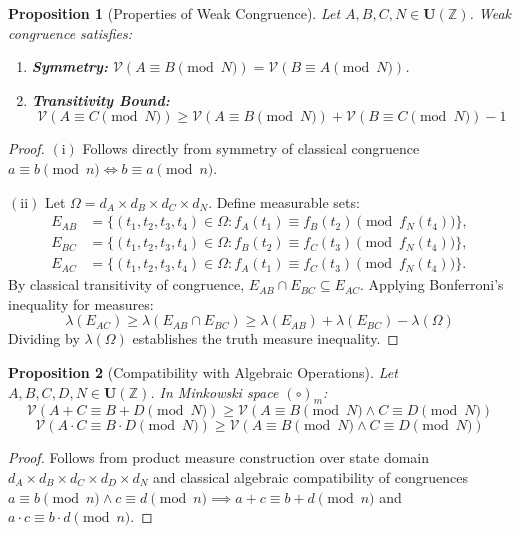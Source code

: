 \documentclass[a4paper,14pt, twoside]{memoir}
\newtheorem{proposition}{Proposition}[chapter]
\newcommand{\tsbd}[1]{\mathbf{U}(\mathbb{#1})}
\newcommand{\ddclmd}{\mathcal{V}} %
\begin{document}
	\begin{proposition}[Properties of Weak Congruence]
		Let $A, B, C, N \in \tsbd{Z}$. Weak congruence satisfies:
		\begin{enumerate}[label=$\mathrm{(\roman*)}$]
			\item \textbf{Symmetry:} $\ddclmd(A \equiv B \pmod N) = \ddclmd(B \equiv A \pmod N)$.
			\item \textbf{Transitivity Bound:} 
			\[
			\ddclmd(A \equiv C \pmod N) \ge \ddclmd(A \equiv B \pmod N) + \ddclmd(B \equiv C \pmod N) - 1
			\]
		\end{enumerate}
	\end{proposition}
	
	\begin{proof}
		$\mathrm{(i)}$ Follows directly from symmetry of classical congruence $a \equiv b \pmod n \iff b \equiv a \pmod n$.
		
		$\mathrm{(ii)}$ Let $\Omega = d_A \times d_B \times d_C \times d_N$. Define measurable sets:
		\begin{align*}
			E_{AB} &= \{(t_1, t_2, t_3, t_4) \in \Omega : f_A(t_1) \equiv f_B(t_2) \pmod{f_N(t_4)}\}, \\
			E_{BC} &= \{(t_1, t_2, t_3, t_4) \in \Omega : f_B(t_2) \equiv f_C(t_3) \pmod{f_N(t_4)}\}, \\
			E_{AC} &= \{(t_1, t_2, t_3, t_4) \in \Omega : f_A(t_1) \equiv f_C(t_3) \pmod{f_N(t_4)}\}.
		\end{align*}
		By classical transitivity of congruence, $E_{AB} \cap E_{BC} \subseteq E_{AC}$. Applying Bonferroni's inequality for measures:
		\[
		\lambda(E_{AC}) \ge \lambda(E_{AB} \cap E_{BC}) \ge \lambda(E_{AB}) + \lambda(E_{BC}) - \lambda(\Omega)
		\]
		Dividing by $\lambda(\Omega)$ establishes the truth measure inequality.
	\end{proof}
	
	\begin{proposition}[Compatibility with Algebraic Operations]
		Let $A, B, C, D, N \in \tsbd{Z}$. In Minkowski space $(\circ)_m$:
		\[
		\ddclmd(A + C \equiv B + D \pmod N) \ge \ddclmd(A \equiv B \pmod N \land C \equiv D \pmod N)
		\]
		\[
		\ddclmd(A \cdot C \equiv B \cdot D \pmod N) \ge \ddclmd(A \equiv B \pmod N \land C \equiv D \pmod N)
		\]
	\end{proposition}
	
	\begin{proof}
		Follows from product measure construction over state domain $d_A \times d_B \times d_C \times d_D \times d_N$ and classical algebraic compatibility of congruences $a \equiv b \pmod n \land c \equiv d \pmod n \implies a+c \equiv b+d \pmod n$ and $a \cdot c \equiv b \cdot d \pmod n$.
	\end{proof}
	
\end{document}
